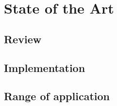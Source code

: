 
\chapter{State of the Art}


\section{Review}



\section{Implementation}


\section{Range of application}

